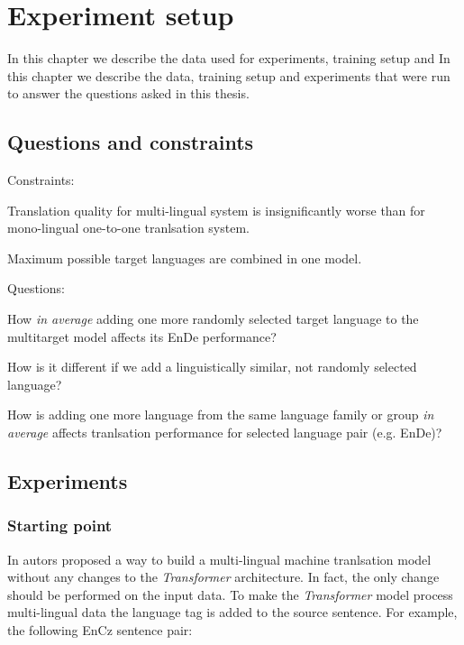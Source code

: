 \chapter{Experiment setup}
\label{chapter:experiment_setup}

In this chapter we describe the data used for experiments, training setup and In this chapter we describe the data, training setup and experiments that were run to answer the questions asked in this thesis.

\section{Questions and constraints}
\label{section:questions_and_constraints}

Constraints:
\begin{displayquote}
	Translation quality for multi-lingual system is insignificantly worse than for
	mono-lingual one-to-one tranlsation system.

	Maximum possible target languages are combined in one model.
\end{displayquote}

Questions:
\begin{displayquote}
	How \emph{in average} adding one more randomly selected target language
	to the multitarget model affects its En\to{}De performance?

	How is it different if we add a linguistically similar, not randomly selected language?

	How is adding one more language from the same language family or group 
	\emph{in average} affects tranlsation performance for selected language
	pair (e.g. En\to{}De)?
\end{displayquote}



\section{Experiments}
\label{section:experiments}
\subsection{Starting point}
\label{subsection:starting_point}

In \cite{johnson-etal-2017-googles} autors proposed a way to build a multi-lingual
machine tranlsation model without any changes to the \emph{Transformer} architecture.
In fact, the only change should be performed on the input data. To make the \emph{Transformer}
model process multi-lingual data the language tag is added to the source sentence.
For example, the following En\to{}Cz sentence pair:

